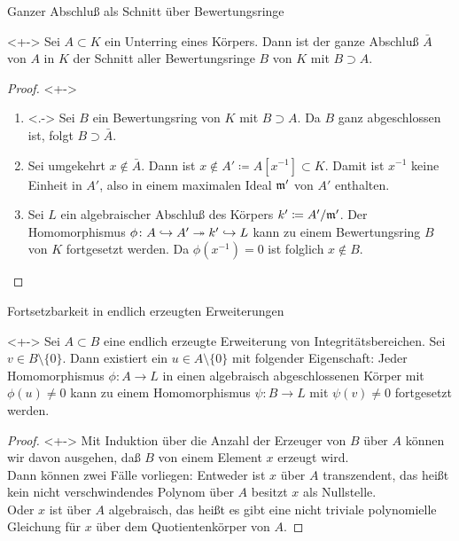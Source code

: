 \begin{frame}{Ganzer Abschluß als Schnitt über Bewertungsringe}
	\begin{corollary}<+->
		Sei \(A \subset K\) ein Unterring eines Körpers. Dann ist
		der ganze Abschluß \(\bar A\) von \(A\) in \(K\) der Schnitt aller
		Bewertungsringe \(B\) von \(K\) mit \(B \supset A\).
	\end{corollary}
	\begin{proof}<+->
		\begin{enumerate}[<+->]
		\item<.->
			Sei \(B\) ein Bewertungsring von \(K\) mit \(B \supset A\). Da
			\(B\) ganz abgeschlossen ist, folgt \(B \supset \bar A\).
		\item
			Sei umgekehrt \(x \notin \bar A\). Dann ist \(x \notin A' \coloneqq
			A[x^{-1}] \subset K\). Damit ist \(x^{-1}\) keine Einheit in \(A'\),
			also in einem maximalen Ideal \(\mathfrak{m}'\) von \(A'\) enthalten.
		\item
			Sei \(L\) ein algebraischer Abschluß des Körpers \(k' \coloneqq
			A'/\mathfrak{m}'\). Der Homomorphismus
			\(\phi\colon A \hookrightarrow A' \twoheadrightarrow k' \hookrightarrow L\) kann zu einem
			Bewertungsring \(B\) von \(K\) fortgesetzt werden. Da
			\(\phi(x^{-1}) = 0\) ist folglich \(x \notin B\).
			\qedhere
		\end{enumerate}
	\end{proof}
\end{frame}

\begin{frame}{Fortsetzbarkeit in endlich erzeugten Erweiterungen}
	\begin{proposition}<+->
		Sei \(A \subset B\) eine endlich erzeugte Erweiterung von
		Integritätsbereichen. Sei \(v \in B \setminus \{0\}\). Dann existiert
		ein \(u \in A \setminus \{0\}\) mit folgender Eigenschaft: Jeder
		Homomorphismus \(\phi\colon A \to L\) in einen algebraisch
		abgeschlossenen Körper mit \(\phi(u) \neq 0\) kann zu einem
		Homomorphismus \(\psi\colon B \to L\) mit \(\psi(v) \neq 0\)
		fortgesetzt werden.
	\end{proposition}
	\begin{proof}<+->
		\renewcommand\qedsymbol{}
		Mit Induktion über die Anzahl der Erzeuger von \(B\) über \(A\)
		können wir davon ausgehen, daß \(B\) von einem Element \(x\)
		erzeugt wird.
		\\
		Dann können zwei Fälle vorliegen: Entweder ist \(x\) über \(A\)
		transzendent, das heißt kein nicht
		verschwindendes Polynom über \(A\) besitzt \(x\) als Nullstelle.
		\\
		Oder \(x\) ist über \(A\) algebraisch, das heißt es gibt eine nicht
		triviale polynomielle Gleichung für \(x\) über dem Quotientenkörper von \(A\).
	\end{proof}
\end{frame}

